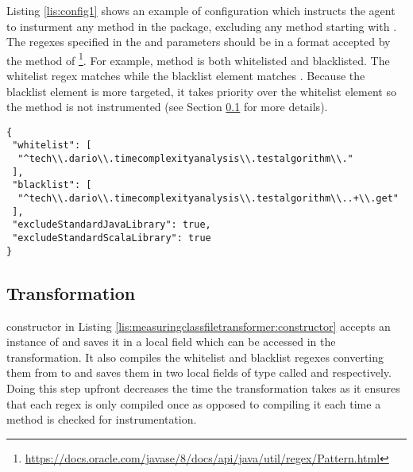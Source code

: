 \noindent Listing \ref{lis:config1} shows an example of configuration which instructs the agent to insturment any method in the  package, excluding any method starting with . The regexes specified in the  and  parameters should be in a format accepted by the  method of \footnote{\url{https://docs.oracle.com/javase/8/docs/api/java/util/regex/Pattern.html}}. For example, method  is both whitelisted and blacklisted. The whitelist regex matches  while the blacklist element matches . Because the blacklist element is more targeted, it takes priority over the whitelist element so the method is not instrumented (see Section \ref{sec:implementation:agent:transformation} for more details).

\noindent\begin{minipage}[c]{\linewidth}
\begin{lstlisting}[breaklines,caption={Configuration JSON file example},label=lis:config1,style=json]
{
 "whitelist": [
  "^tech\\.dario\\.timecomplexityanalysis\\.testalgorithm\\."
 ],
 "blacklist": [
  "^tech\\.dario\\.timecomplexityanalysis\\.testalgorithm\\..+\\.get"
 ],
 "excludeStandardJavaLibrary": true,
 "excludeStandardScalaLibrary": true
}
\end{lstlisting}
\end{minipage}

\subsection{Transformation}
\label{sec:implementation:agent:transformation}

 constructor in Listing \ref{lis:measuringclassfiletransformer:constructor} accepts an instance of  and saves it in a local field which can be accessed in the transformation. It also compiles the whitelist and blacklist regexes converting them from  to  and saves them in two local fields of type  called  and  respectively. Doing this step upfront decreases the time the transformation takes as it ensures that each regex is only compiled once as opposed to compiling it each time a method is checked for instrumentation.

